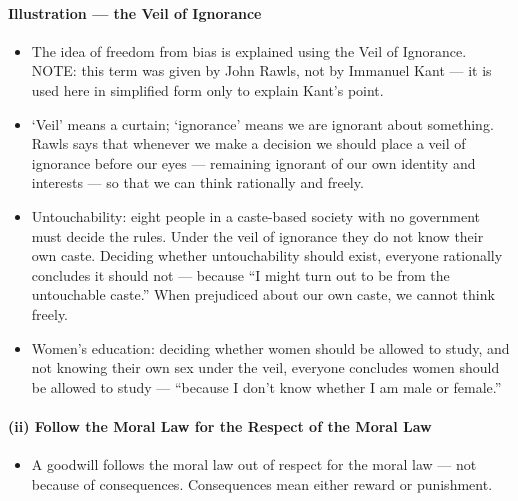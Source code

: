 \paragraph{Illustration --- the Veil of Ignorance}

\begin{CriticalPoint}
\begin{itemize}
\item The idea of freedom from bias is explained using the Veil of Ignorance. NOTE: this term was given by John Rawls, not by Immanuel Kant --- it is used here in simplified form only to explain Kant's point.
\item `Veil' means a curtain; `ignorance' means we are ignorant about something. Rawls says that whenever we make a decision we should place a veil of ignorance before our eyes --- remaining ignorant of our own identity and interests --- so that we can think rationally and freely.
\end{itemize}
\end{CriticalPoint}

\begin{ExampleBox}
\begin{itemize}
\item Untouchability: eight people in a caste-based society with no government must decide the rules. Under the veil of ignorance they do not know their own caste. Deciding whether untouchability should exist, everyone rationally concludes it should not --- because ``I might turn out to be from the untouchable caste.'' When prejudiced about our own caste, we cannot think freely.
\item Women's education: deciding whether women should be allowed to study, and not knowing their own sex under the veil, everyone concludes women should be allowed to study --- ``because I don't know whether I am male or female.''
\end{itemize}
\end{ExampleBox}

\paragraph{(ii) Follow the Moral Law for the Respect of the Moral Law}
\begin{itemize}
\item A goodwill follows the moral law out of respect for the moral law --- not because of consequences. Consequences mean either reward or punishment.
\end{itemize}

